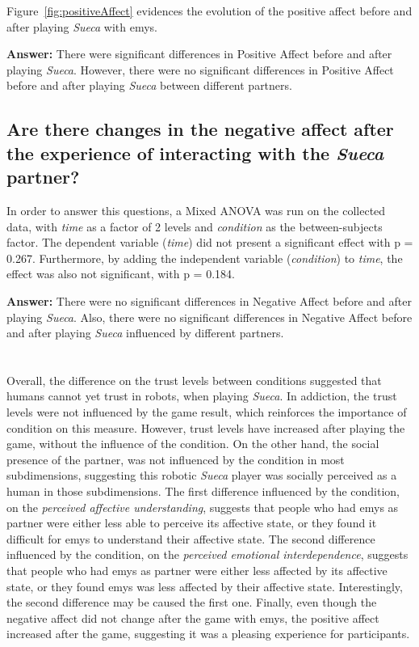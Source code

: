Figure~\ref{fig:positiveAffect} evidences the evolution of the positive affect before and after playing \emph{Sueca} with \ac{emys}.

\textbf{Answer:} There were significant differences in Positive Affect before and after playing \emph{Sueca}.
However, there were no significant differences in Positive Affect before and after playing \emph{Sueca} between different partners.

\subsection*{Are there changes in the negative affect after the experience of interacting with the \emph{Sueca} partner?}
In order to answer this questions, a Mixed ANOVA was run on the collected data, with \emph{time} as a factor of 2 levels and \emph{condition} as the between-subjects factor.
The dependent variable (\emph{time}) did not present a significant effect with p = 0.267.
Furthermore, by adding the independent variable (\emph{condition}) to \emph{time}, the effect was also not significant, with p = 0.184.

\textbf{Answer:} There were no significant differences in Negative Affect before and after playing \emph{Sueca}.
Also, there were no significant differences in Negative Affect before and after playing \emph{Sueca} influenced by different partners.

\section*{\centering*}

Overall, the difference on the trust levels between conditions suggested that humans cannot yet trust in robots, when playing \emph{Sueca}.
In addiction, the trust levels were not influenced by the game result, which reinforces the importance of condition on this measure.
However, trust levels have increased after playing the game, without the influence of the condition.
On the other hand, the social presence of the partner, was not influenced by the condition in most subdimensions, suggesting this robotic \emph{Sueca} player was socially perceived as a human in those subdimensions.
The first difference influenced by the condition, on the \emph{perceived affective understanding}, suggests that people who had \ac{emys} as partner were either less able to perceive its affective state, or they found it difficult for \ac{emys} to understand their affective state.
The second difference influenced by the condition, on the \emph{perceived emotional interdependence}, suggests that people who had \ac{emys} as partner were either less affected by its affective state, or they found \ac{emys} was less affected by their affective state.
Interestingly, the second difference may be caused the first one.
Finally, even though the negative affect did not change after the game with \ac{emys}, the positive affect increased after the game, suggesting it was a pleasing experience for participants.

\clearpage

